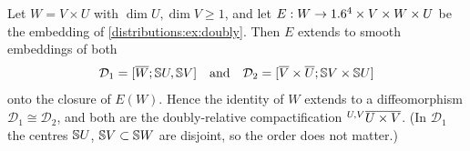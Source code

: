 \begin{proposition}\label{blowup:prop:doubly}
Let $W=V\times U$ with $\dim U,\dim V\ge1$, and let
$E:W\to1.6^4\times V\times W\times U$ be the embedding of \cref{distributions:ex:doubly}.
Then $E$ extends to smooth embeddings of both
\begin{equation*}
  \mathcal D_1=[\overline{W};\mathbb{S} U,\mathbb{S} V]\quad\text{and}\quad
  \mathcal D_2=[\overline{V}\times\overline{U};\mathbb{S} V\times\mathbb{S} U]
\end{equation*}
onto the closure of $E(W)$. Hence the identity of $W$ extends to a diffeomorphism
$\mathcal D_1\cong\mathcal D_2$, and both are the doubly-relative compactification
${}^{U,V}\overline{U\times V}$. \textup{(}In $\mathcal D_1$ the centres $\mathbb{S} U$, $\mathbb{S} V\subset\mathbb{S} W$
are disjoint, so the order does not matter.\textup{)}
\end{proposition}
